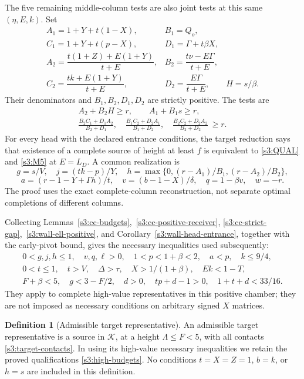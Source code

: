 \documentclass[11pt,reqno]{amsart}
\theoremstyle{definition}
\newtheorem{definition}[theorem]{Definition}
\theoremstyle{remark}
\begin{document}
The five remaining middle-column tests are also joint tests at this
same \((\eta,E,k)\). Set
\[
\begin{array}{ll}
 A_1=1+Y+t(1-X),& B_1=Q_o,\\
 C_1=1+Y+t(p-X),& D_1=\Gamma+t\beta X,\\
 A_2=\dfrac{t(1+Z)+E(1+Y)}{t+E},&
 B_2=\dfrac{t\nu-E\Gamma}{t+E},\\
 C_2=\dfrac{tk+E(1+Y)}{t+E},&
 D_2=\dfrac{E\Gamma}{t+E},\qquad H=s/\beta.
\end{array}
\]
Their denominators and \(B_1,B_2,D_1,D_2\) are strictly positive.
The tests are
\begin{equation}\label{s3:M5}
 \begin{gathered}
 A_2+B_2H\ge r,\qquad A_1+B_1s\ge r,\\
 \frac{B_2C_1+D_1A_2}{B_2+D_1},\quad
 \frac{B_1C_2+D_2A_1}{B_1+D_2},\quad
 \frac{B_2C_2+D_2A_2}{B_2+D_2}\ \ge r.
 \end{gathered}
\end{equation}
For every head with the declared entrance conditions, the target
reduction says that existence of a complete source of height at least
\(f\) is equivalent to \eqref{s3:QUAL} and \eqref{s3:M5} at
\(E=L_D\). A common realization is
\[
 g=s/V,\quad j=(tk-p)/Y,\quad
 h=\max\{0,(r-A_1)/B_1,(r-A_2)/B_2\},
\]
\[
 a=(r-1-Y+\Gamma h)/t,\quad
 v=(b-1-X)/\delta,\quad q=1-\beta v,\quad w=-r.
\]
The proof uses the exact complete-column reconstruction, not separate
optimal completions of different columns.

Collecting Lemmas~\ref{s3:cc-budgets},~\ref{s3:cc-positive-receiver},
\ref{s3:cc-strict-gap},~\ref{s3:wall-ell-positive}, and
Corollary~\ref{s3:wall-head-entrance}, together with the early-pivot
bound, gives the necessary inequalities used subsequently:
\begin{equation}\label{s3:high-budgets}
\begin{gathered}
 0<g,j,h\le1,\quad v,q,\ell>0,\quad
 1<p<1+\beta<2,\quad a<p,\quad k\le9/4,\\
 0<t\le1,\quad t>V,\quad\Delta>\tau,\quad
 X>1/(1+\beta),\quad Ek<1-T,\\
 F+\beta<5,\quad g<3-F/2,\quad
 d>0,\quad tp+d-1>0,\quad1+t+d<33/16.
\end{gathered}
\end{equation}
They apply to complete high-value representatives in this positive
chamber; they are not imposed as necessary conditions on arbitrary
signed \(X\) matrices.

\begin{definition}[Admissible target representative]
\label{s3:target-representative}
An admissible target representative is a source in
\(\mathcal K\), at a height \(\Lambda\le F<5\), with all
contacts \eqref{s3:target-contacts}. In using its high-value
necessary inequalities we retain the proved qualifications
\eqref{s3:high-budgets}. No conditions \(t=X=Z=1\), \(b=k\),
or \(h=s\) are included in this definition.
\end{definition}
\end{document}
